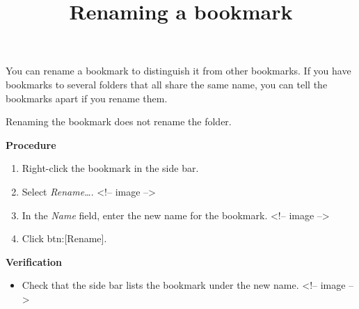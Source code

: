 \documentclass[11pt,a4paper]{article}
\title{Renaming a bookmark}
\begin{document}
\maketitle

You can rename a bookmark to distinguish it from other bookmarks. If you have bookmarks to several folders that all share the same name, you can tell the bookmarks apart if you rename them.

Renaming the bookmark does not rename the folder.

\textbf{Procedure}

\begin{enumerate}
\item Right-click the bookmark in the side bar.
\item Select \textit{Rename…}.
<!-- image -->
\item In the \textit{Name} field, enter the new name for the bookmark.
<!-- image -->
\item Click btn:[Rename].
\end{enumerate}

\textbf{Verification}

\begin{itemize}
\item Check that the side bar lists the bookmark under the new name.
<!-- image -->
\end{itemize}
\end{document}
